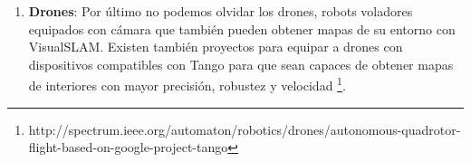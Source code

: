 \begin {enumerate}
\begin{figure}[H]
\begin{center}
\hspace{0.5cm}
\hspace{0.5cm}
\end{center}
\caption{Robot Dyson 360 Eye (a) Robot Roomba 966 (b) }
\end{figure}

\item \textbf{Drones}: 
Por último no podemos olvidar los drones, robots voladores equipados con cámara que también pueden obtener mapas de su entorno con VisualSLAM. Existen también proyectos para equipar a drones con dispositivos compatibles con Tango para que sean capaces de obtener mapas de interiores con mayor precisión, robustez y velocidad \footnote{http://spectrum.ieee.org/automaton/robotics/drones/autonomous-quadrotor-flight-based-on-google-project-tango}.



\end{enumerate}
